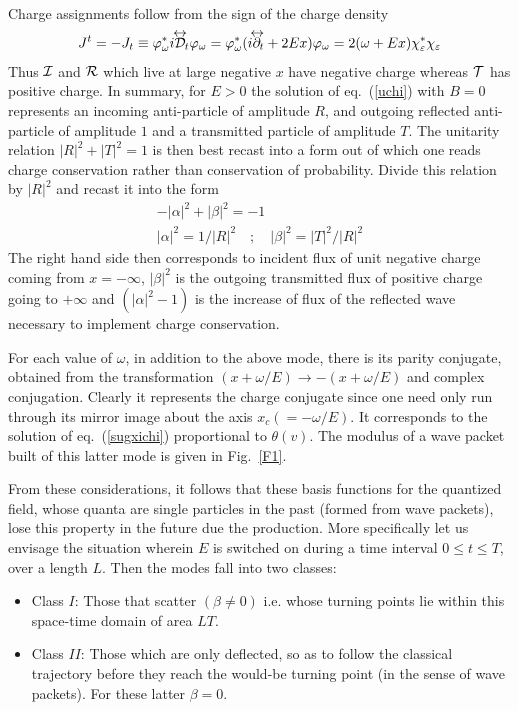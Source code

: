 \documentclass[12pt,oneside]{report}
\def\lrpartial{{\partial\kern-.75em\raise1.75ex
\hbox{$\leftrightarrow$}}\!\!}
\def\lrD{{{\cal D}\kern-.9em\raise1.75ex\hbox{$\leftrightarrow$}}\!}
\begin{document}
\par Charge assignments follow from the sign of the charge density
 \begin{eqnarray}
J^t=-
J_t\equiv \varphi^*_{\omega} i {\lrD_t} \varphi_{\omega}=
\varphi^*_{\omega}(i \lrpartial_t +2 E x)\varphi_{\omega}=
2(\omega +Ex)\chi_{\varepsilon}^*\chi_{\varepsilon}
\label{jt}
\end{eqnarray}
  Thus
${\cal I}$ and ${\cal R}$ which live at large negative $x$ have negative
charge
whereas ${\cal T}$ has positive charge.   
In summary, for $E > 0$ the 
solution of eq.~(\ref{uchi}) with $B=0$ represents
an incoming anti-particle of amplitude $R$, and
outgoing reflected anti-particle of amplitude $1$ 
and a transmitted particle of amplitude $T$.   The
unitarity relation $|R|^2 + |T|^2 = 1$ is then best recast into
a form out of which one reads charge conservation rather than
conservation of probability.  Divide this relation by $|R|^2$ and recast
it into the form
\begin{eqnarray}
 &-|\alpha|^2 + |\beta|^2 = -1 \label{unitarity}& \nonumber\\
 &|\alpha|^2 = 1/|R|^2 \quad; \quad |\beta|^2 =
|T|^2/|R|^2 &\label{coefbog}
\end{eqnarray}
The right hand side then corresponds to incident flux of
unit negative charge coming from $x=-\infty$, $|\beta|^2$ is the outgoing 
 transmitted flux of
positive charge going to $+\infty$ and $(|\alpha|^2 - 1)$ is the increase of
flux of the reflected wave necessary to implement charge
conservation.
\par For each value of $\omega$, in addition to the above mode, there is
its parity conjugate, obtained from the transformation $(x+\omega /E)\to
-(x+\omega /E)$ and complex conjugation.
Clearly it represents the charge conjugate since one need only run through
its mirror image about the 
axis $x_c (=- \omega/E)$. It corresponds to the solution
of eq.~(\ref{sugxichi}) proportional to $\theta (v)$.
The modulus of a wave packet built of this latter mode 
is given in Fig.~\ref{F1}.
\par From these considerations, it follows that these basis functions for the
quantized 
field, whose quanta are single particles in the past (formed from wave packets),
lose this property in the future due the production. More  specifically let us
envisage the situation wherein $E$ is switched on during a time interval $0\leq
t\leq T$, over
a length $L$. Then the modes fall into two classes:
\begin{itemize}
\item{Class $I$:} Those that scatter $(\beta \neq 0)$ i.e. whose turning
points lie
within this space-time domain of area $LT$.
\item{Class $II$:} Those which are only deflected, so as to follow the
classical trajectory
before they reach the would-be turning point (in the sense of wave
packets). For these latter
$\beta =0$.
\end {itemize}
\end{document}
